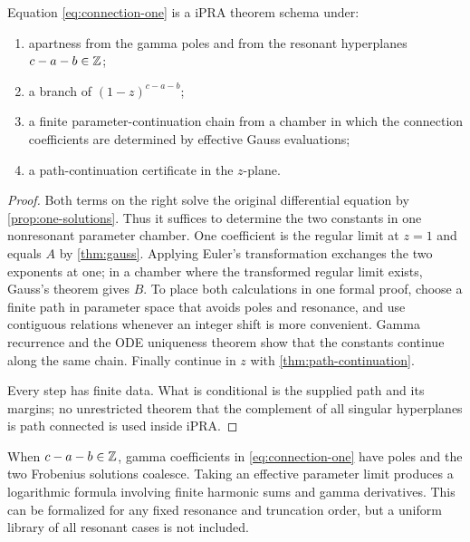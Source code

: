 \begin{theorem}\label{thm:connection}
Equation \eqref{eq:connection-one} is a \StatusC{} iPRA theorem schema under:
\begin{enumerate}
\item apartness from the gamma poles and from the resonant hyperplanes
\(c-a-b\in\mathbb Z\);
\item a branch of \((1-z)^{c-a-b}\);
\item a finite parameter-continuation chain from a chamber in which the
connection coefficients are determined by effective Gauss evaluations;
\item a path-continuation certificate in the \(z\)-plane.
\end{enumerate}
\end{theorem}

\begin{proof}
Both terms on the right solve the original differential equation by
\cref{prop:one-solutions}.  Thus it suffices to determine the two constants in
one nonresonant parameter chamber.  One coefficient is the regular limit at
\(z=1\) and equals \(A\) by \cref{thm:gauss}.  Applying Euler's
transformation exchanges the two exponents at one; in a chamber where the
transformed regular limit exists, Gauss's theorem gives \(B\).  To place both
calculations in one formal proof, choose a finite path in parameter space that
avoids poles and resonance, and use contiguous relations whenever an integer
shift is more convenient.  Gamma recurrence and the ODE uniqueness theorem
show that the constants continue along the same chain.  Finally continue in
\(z\) with \cref{thm:path-continuation}.

Every step has finite data.  What is conditional is the supplied path and its
margins; no unrestricted theorem that the complement of all singular
hyperplanes is path connected is used inside iPRA.
\end{proof}

\begin{remark}
When \(c-a-b\in\mathbb Z\), gamma coefficients in
\eqref{eq:connection-one} have poles and the two Frobenius solutions coalesce.
Taking an effective parameter limit produces a logarithmic formula involving
finite harmonic sums and gamma derivatives.  This can be formalized for any
fixed resonance and truncation order, but a uniform library of all resonant
cases is not included.
\end{remark}

